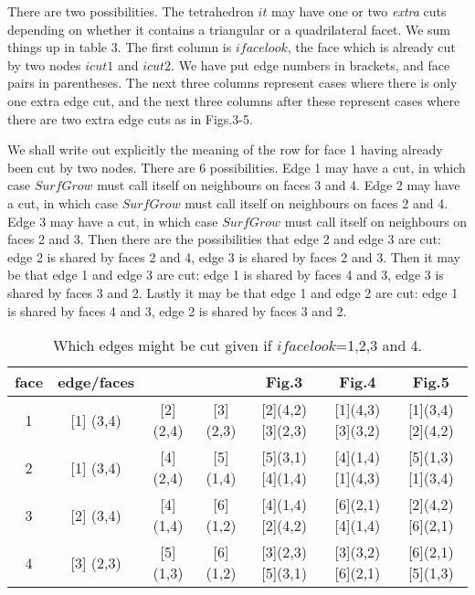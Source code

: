 \documentclass[12pt]{article}
\begin{document}
There are two possibilities. The tetrahedron $it$ may have one or two
{\it extra} cuts depending on whether it contains a triangular or
a quadrilateral facet. We sum things up in table 3. The first column
is $ifacelook$, the face which is already cut by two nodes $icut1$ and
$icut2$. We have put edge numbers in brackets, and face pairs in parentheses.
The next three columns represent cases where there is only one extra edge cut,
and the next three columns after these represent cases where there are two
extra edge cuts as in Figs.3-5.

We shall write out explicitly the meaning of the row for face 1 having
already been cut by two nodes. There are 6 possibilities. 
Edge 1 may
have a cut, in which case $SurfGrow$ must call itself on neighbours 
 on faces 3 and 4.
Edge 2 may
have a cut, in which case $SurfGrow$ must call itself on neighbours 
 on faces 2 and 4.
Edge 3 may
have a cut, in which case $SurfGrow$ must call itself on neighbours 
 on faces 2 and 3.
Then there are the possibilities that
edge 2 and edge 3 are cut: edge 2 is shared by faces 2 and 4, edge
 3 is shared by faces 2 and 3.
Then it may be that 
edge 1 and edge 3 are cut: edge 1 is shared by faces 4 and 3, edge
 3 is shared by faces 3 and 2.
Lastly it may be that
edge 1 and edge 2 are cut: edge 1 is shared by faces 4 and 3, edge
 2 is shared by faces 3 and 2.



\begin{table}
\begin{center}
 \begin{tabular}{|c|c|c|c|c|c|c|}\hline
face  &edge/faces &          &           &  Fig.3  & Fig.4   & Fig.5   \\ \hline
  1   &      [1] (3,4)   & [2] (2,4)  &   [3] (2,3) & 
 [2](4,2)[3](2,3)  &  [1](4,3)[3](3,2)  & [1](3,4)[2](4,2)   \\ \hline 
  2   &      [1] (3,4)   & [4] (2,4)  &   [5] (1,4) & 
 [5](3,1)[4](1,4)  &  [4](1,4)[1](4,3)  & [5](1,3)[1](3,4)   \\ \hline 
  3   &      [2] (3,4)   & [4] (1,4)  &   [6] (1,2) & 
 [4](1,4)[2](4,2)  &  [6](2,1)[4](1,4)  & [2](4,2)[6](2,1)   \\ \hline 
  4   &      [3] (2,3)   & [5] (1,3)  &   [6] (1,2) &  
 [3](2,3)[5](3,1)  &  [3](3,2)[6](2,1)  & [6](2,1)[5](1,3)   \\ \hline 
\end{tabular}
\end{center}
\caption{
Which edges might be cut given if  $ifacelook$=1,2,3 and 4.}
\end{table}
\end{document}
